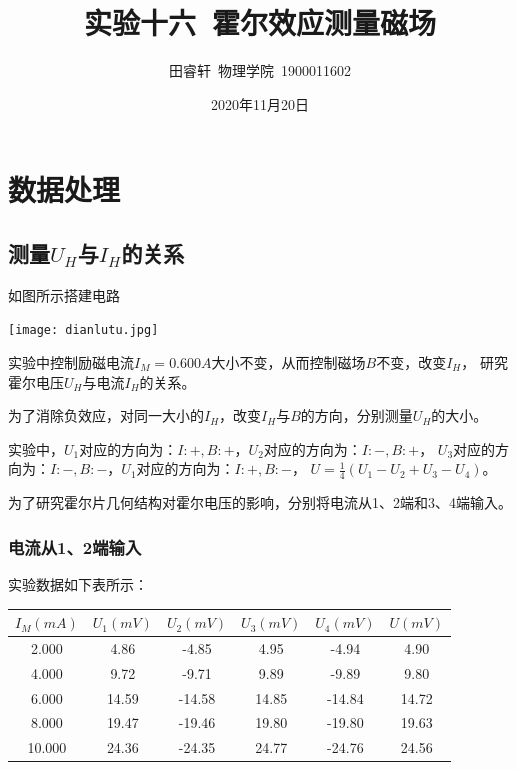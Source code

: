 \documentclass{article}
\title{\heiti 实验十六\ 霍尔效应测量磁场}
\author{\kaishu 田睿轩\ 物理学院\ 1900011602}
\date{2020年11月20日}
\begin{document}
    \maketitle
    \section{数据处理}
    \subsection{测量$U_H$与$I_H$的关系}
    如图所示搭建电路

    \begin{center}
        \texttt{[image: dianlutu.jpg]}  
    \end{center}
    
    实验中控制励磁电流$I_M=0.600A$大小不变，从而控制磁场$B$不变，改变$I_H$，
    研究霍尔电压$U_H$与电流$I_H$的关系。

    为了消除负效应，对同一大小的$I_H$，改变$I_H$与$B$的方向，分别测量$U_H$的大小。

    实验中，$U_1$对应的方向为：$I:+,B:+$，$U_2$对应的方向为：$I:-,B:+$，
    $U_3$对应的方向为：$I:-,B:-$，$U_1$对应的方向为：$I:+,B:-$，
    $U=\frac{1}{4}(U_1-U_2+U_3-U_4)$。

    为了研究霍尔片几何结构对霍尔电压的影响，分别将电流从1、2端和3、4端输入。

    \subsubsection{电流从1、2端输入}

    实验数据如下表所示：
    \begin{center}
        \begin{tabular}{|c|c|c|c|c|c|}
            \hline
            $I_M(mA)$ & $U_1(mV)$ & $U_2(mV)$ & $U_3(mV)$ & $U_4(mV)$ & $U(mV)$ \\
            \hline
            2.000 & 4.86 & -4.85 & 4.95 & -4.94 & 4.90\\
            \hline
            4.000 & 9.72 & -9.71 & 9.89 & -9.89 & 9.80\\
            \hline
            6.000 & 14.59 & -14.58 & 14.85 & -14.84 & 14.72\\
            \hline
            8.000 &  19.47 & -19.46 & 19.80 & -19.80 & 19.63\\
            \hline
            10.000 & 24.36 & -24.35 & 24.77 & -24.76 & 24.56\\
            \hline
        \end{tabular}        
    \end{center}
\end{document}
